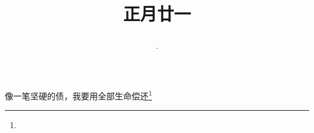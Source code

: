 \title{\date[d=1,m=3,y=2024][year:cn-y,年,month:cn,day:cn,日,·,weekday]·正月廿一 }
像一笔坚硬的债，我要用全部生命偿还\footnote{ }

